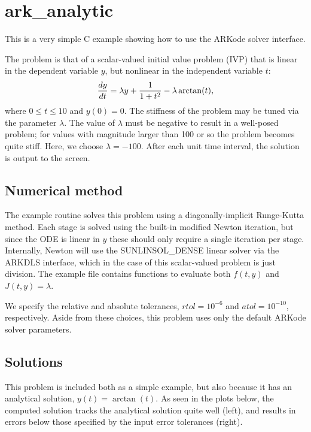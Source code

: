 \documentclass[letterpaper,10pt,english]{sphinxmanual}
\begin{document}
\section{ark\_analytic}
\label{c_serial:ark-analytic}\label{c_serial:id1}
This is a very simple C example showing how to use the ARKode solver
interface.

The problem is that of a scalar-valued initial value problem (IVP)
that is linear in the dependent variable \(y\), but nonlinear in
the independent variable \(t\):
\begin{gather}
\begin{split}\frac{dy}{dt} = \lambda y + \frac{1}{1+t^2} - \lambda \arctan(t),\end{split}\notag
\end{gather}
where \(0\le t\le 10\) and \(y(0)=0\).  The stiffness of the
problem may be tuned via the parameter \(\lambda\).  The value of
\(\lambda\) must be negative to result in a well-posed problem;
for values with magnitude larger than 100 or so the problem becomes
quite stiff.  Here, we choose \(\lambda=-100\).  After each unit
time interval, the solution is output to the screen.


\subsection{Numerical method}
\label{c_serial:numerical-method}
The example routine solves this problem using a diagonally-implicit
Runge-Kutta method.  Each stage is solved using the built-in modified
Newton iteration, but since the ODE is linear in \(y\) these
should only require a single iteration per stage.  Internally, Newton
will use the SUNLINSOL\_DENSE linear solver via the ARKDLS interface,
which in the case of this scalar-valued problem is just division.  The
example file contains functions to evaluate both \(f(t,y)\) and
\(J(t,y)=\lambda\).

We specify the relative and absolute tolerances, \(rtol=10^{-6}\)
and \(atol=10^{-10}\), respectively.  Aside from these choices,
this problem uses only the default ARKode solver parameters.


\subsection{Solutions}
\label{c_serial:solutions}
This problem is included both as a simple example, but also because it
has an analytical solution, \(y(t) = \arctan(t)\).  As seen in the
plots below, the computed solution tracks the analytical solution
quite well (left), and results in errors below those specified by the input
error tolerances (right).
\end{document}
